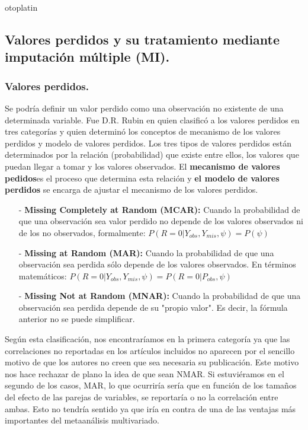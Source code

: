 otoplatin\documentclass[a4paper,openright,12pt]{report}
\begin{document}
\subsection{Valores perdidos y su tratamiento mediante imputación múltiple (MI).}

\subsubsection{Valores perdidos.}

Se podría definir un valor perdido como una observación no existente de una determinada variable. Fue D.R. Rubin en \cite{Rubin1976} quien clasificó a los valores perdidos en tres categorías y quien determinó los conceptos de mecanismo de los valores perdidos y modelo de valores perdidos. Los tres tipos de valores perdidos están determinados por la relación (probabilidad) que existe entre ellos, los valores que puedan llegar a tomar y los valores observados. El \textbf{mecanismo de valores pedidos}es el proceso que determina esta relación y \textbf{el modelo de valores perdidos} se encarga de ajustar el mecanismo de los valores perdidos.
\begin{itemize}
\item[-] \textbf{Missing Completely at Random (MCAR):} Cuando la probabilidad de que una observación sea valor perdido no depende de los valores observados ni de los no observados, formalmente: $P(R=0 \vert Y_{obs},Y_{mis},\psi)=P(\psi)$ 
\item[-] \textbf{Missing at Random (MAR):} Cuando la probabilidad de que una observación sea perdida sólo depende de los valores observados. En términos matemáticos: $P(R=0\vert Y_{obs},Y_{mis},\psi)=P(R=0\vert P_{obs},\psi)$
\item[-] \textbf{Missing Not at Random (MNAR):} Cuando la probabilidad de que una observación sea perdida depende de su "propio valor". Es decir, la fórmula anterior no se puede simplificar.
\end{itemize}

Según esta clasificación, nos encontraríamos en la primera categoría ya que las correlaciones no reportadas en los artículos incluidos no aparecen por el sencillo motivo de que los autores no creen que sea necesaria su publicación. Este motivo nos hace rechazar de plano la idea de que sean NMAR. Si estuviéramos en el segundo de los casos, MAR, lo que ocurriría sería que en función de los tamaños del efecto de las parejas de variables, se reportaría o no la correlación entre ambas. Esto no tendría sentido ya que iría en contra de una de las ventajas más importantes del metaanálisis multivariado.
\end{document}
